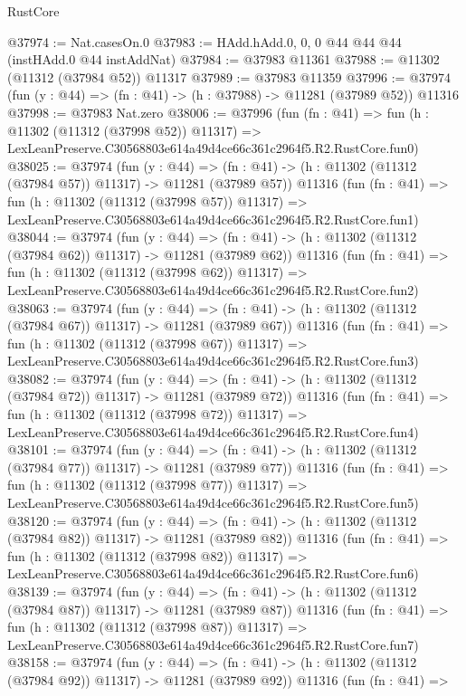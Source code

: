 \begin{lexlean}{RustCore}
\begin{coremodule}
@37974 := Nat.casesOn.{0}
@37983 := HAdd.hAdd.{0, 0, 0} @44 @44 @44 (instHAdd.{0} @44 instAddNat)
@37984 := @37983 @11361
@37988 := @11302 (@11312 (@37984 @52)) @11317
@37989 := @37983 @11359
@37996 := @37974 (fun (y : @44) => (fn : @41) -> (h : @37988) -> @11281 (@37989 @52)) @11316
@37998 := @37983 Nat.zero
@38006 := @37996
    (fun (fn : @41) =>
    fun (h : @11302 (@11312 (@37998 @52)) @11317) =>
    LexLeanPreserve.C30568803e614a49d4ce66c361c2964f5.R2.RustCore.fun0)
@38025 := @37974
    (fun (y : @44) =>
    (fn : @41) -> (h : @11302 (@11312 (@37984 @57)) @11317) -> @11281 (@37989 @57))
    @11316
    (fun (fn : @41) =>
    fun (h : @11302 (@11312 (@37998 @57)) @11317) =>
    LexLeanPreserve.C30568803e614a49d4ce66c361c2964f5.R2.RustCore.fun1)
@38044 := @37974
    (fun (y : @44) =>
    (fn : @41) -> (h : @11302 (@11312 (@37984 @62)) @11317) -> @11281 (@37989 @62))
    @11316
    (fun (fn : @41) =>
    fun (h : @11302 (@11312 (@37998 @62)) @11317) =>
    LexLeanPreserve.C30568803e614a49d4ce66c361c2964f5.R2.RustCore.fun2)
@38063 := @37974
    (fun (y : @44) =>
    (fn : @41) -> (h : @11302 (@11312 (@37984 @67)) @11317) -> @11281 (@37989 @67))
    @11316
    (fun (fn : @41) =>
    fun (h : @11302 (@11312 (@37998 @67)) @11317) =>
    LexLeanPreserve.C30568803e614a49d4ce66c361c2964f5.R2.RustCore.fun3)
@38082 := @37974
    (fun (y : @44) =>
    (fn : @41) -> (h : @11302 (@11312 (@37984 @72)) @11317) -> @11281 (@37989 @72))
    @11316
    (fun (fn : @41) =>
    fun (h : @11302 (@11312 (@37998 @72)) @11317) =>
    LexLeanPreserve.C30568803e614a49d4ce66c361c2964f5.R2.RustCore.fun4)
@38101 := @37974
    (fun (y : @44) =>
    (fn : @41) -> (h : @11302 (@11312 (@37984 @77)) @11317) -> @11281 (@37989 @77))
    @11316
    (fun (fn : @41) =>
    fun (h : @11302 (@11312 (@37998 @77)) @11317) =>
    LexLeanPreserve.C30568803e614a49d4ce66c361c2964f5.R2.RustCore.fun5)
@38120 := @37974
    (fun (y : @44) =>
    (fn : @41) -> (h : @11302 (@11312 (@37984 @82)) @11317) -> @11281 (@37989 @82))
    @11316
    (fun (fn : @41) =>
    fun (h : @11302 (@11312 (@37998 @82)) @11317) =>
    LexLeanPreserve.C30568803e614a49d4ce66c361c2964f5.R2.RustCore.fun6)
@38139 := @37974
    (fun (y : @44) =>
    (fn : @41) -> (h : @11302 (@11312 (@37984 @87)) @11317) -> @11281 (@37989 @87))
    @11316
    (fun (fn : @41) =>
    fun (h : @11302 (@11312 (@37998 @87)) @11317) =>
    LexLeanPreserve.C30568803e614a49d4ce66c361c2964f5.R2.RustCore.fun7)
@38158 := @37974
    (fun (y : @44) =>
    (fn : @41) -> (h : @11302 (@11312 (@37984 @92)) @11317) -> @11281 (@37989 @92))
    @11316
    (fun (fn : @41) =>

\end{coremodule}
\end{lexlean}
